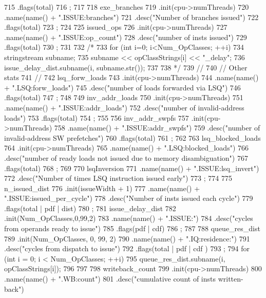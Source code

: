 \begin{DoxyCode}
{715         .flags(total)
716         ;
717 
718     exe_branches
719         .init(cpu->numThreads)
720         .name(name() + ".ISSUE:branches")
721         .desc("Number of branches issued")
722         .flags(total)
723         ;
724 
725     issued_ops
726         .init(cpu->numThreads)
727         .name(name() + ".ISSUE:op_count")
728         .desc("number of insts issued")
729         .flags(total)
730         ;
731 
732 /*
733     for (int i=0; i<Num_OpClasses; ++i) {
734         stringstream subname;
735         subname << opClassStrings[i] << "_delay";
736         issue_delay_dist.subname(i, subname.str());
737     }
738 */
739     //
740     //  Other stats
741     //
742     lsq_forw_loads
743         .init(cpu->numThreads)
744         .name(name() + ".LSQ:forw_loads")
745         .desc("number of loads forwarded via LSQ")
746         .flags(total)
747         ;
748 
749     inv_addr_loads
750         .init(cpu->numThreads)
751         .name(name() + ".ISSUE:addr_loads")
752         .desc("number of invalid-address loads")
753         .flags(total)
754         ;
755 
756     inv_addr_swpfs
757         .init(cpu->numThreads)
758         .name(name() + ".ISSUE:addr_swpfs")
759         .desc("number of invalid-address SW prefetches")
760         .flags(total)
761         ;
762 
763     lsq_blocked_loads
764         .init(cpu->numThreads)
765         .name(name() + ".LSQ:blocked_loads")
766         .desc("number of ready loads not issued due to memory disambiguation")
767         .flags(total)
768         ;
769 
770     lsqInversion
771         .name(name() + ".ISSUE:lsq_invert")
772         .desc("Number of times LSQ instruction issued early")
773         ;
774 
775     n_issued_dist
776         .init(issueWidth + 1)
777         .name(name() + ".ISSUE:issued_per_cycle")
778         .desc("Number of insts issued each cycle")
779         .flags(total | pdf | dist)
780         ;
781     issue_delay_dist
782         .init(Num_OpClasses,0,99,2)
783         .name(name() + ".ISSUE:")
784         .desc("cycles from operands ready to issue")
785         .flags(pdf | cdf)
786         ;
787 
788     queue_res_dist
789         .init(Num_OpClasses, 0, 99, 2)
790         .name(name() + ".IQ:residence:")
791         .desc("cycles from dispatch to issue")
792         .flags(total | pdf | cdf )
793         ;
794     for (int i = 0; i < Num_OpClasses; ++i) {
795         queue_res_dist.subname(i, opClassStrings[i]);
796     }
797 
798     writeback_count
799         .init(cpu->numThreads)
800         .name(name() + ".WB:count")
801         .desc("cumulative count of insts written-back")
}
\end{DoxyCode}
